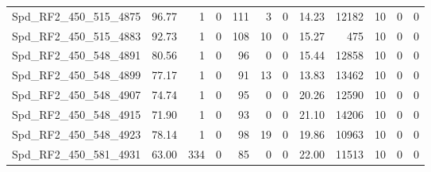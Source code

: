 \begin{longtable}[c]{@{}lrrrrrrrrrrr@{}}
Spd\_RF2\_450\_515\_4875     & 96.77                  & 1                       & 0                       & 111                    & 3                       & 0                       & 14.23                   & 12182                    & 10                       & 0                        & 0                        \\
Spd\_RF2\_450\_515\_4883     & 92.73                  & 1                       & 0                       & 108                    & 10                      & 0                       & 15.27                   & 475                      & 10                       & 0                        & 0                        \\
Spd\_RF2\_450\_548\_4891     & 80.56                  & 1                       & 0                       & 96                     & 0                       & 0                       & 15.44                   & 12858                    & 10                       & 0                        & 0                        \\
Spd\_RF2\_450\_548\_4899     & 77.17                  & 1                       & 0                       & 91                     & 13                      & 0                       & 13.83                   & 13462                    & 10                       & 0                        & 0                        \\
Spd\_RF2\_450\_548\_4907     & 74.74                  & 1                       & 0                       & 95                     & 0                       & 0                       & 20.26                   & 12590                    & 10                       & 0                        & 0                        \\
Spd\_RF2\_450\_548\_4915     & 71.90                  & 1                       & 0                       & 93                     & 0                       & 0                       & 21.10                   & 14206                    & 10                       & 0                        & 0                        \\
Spd\_RF2\_450\_548\_4923     & 78.14                  & 1                       & 0                       & 98                     & 19                      & 0                       & 19.86                   & 10963                    & 10                       & 0                        & 0                        \\
Spd\_RF2\_450\_581\_4931     & 63.00                  & 334                     & 0                       & 85                     & 0                       & 0                       & 22.00                   & 11513                    & 10                       & 0                        & 0                        \\

\end{longtable}

